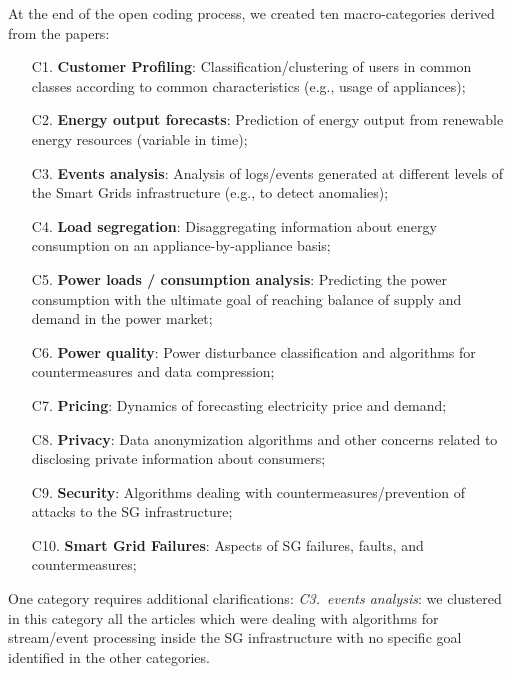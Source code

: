 \documentclass[journal]{IEEEtran}
\begin{document}
At the end of the open coding process, we created ten macro-categories derived from the papers: 

\begin{enumerate}
\item[C1.] \textbf{Customer Profiling}: Classification/clustering of users in common classes according to common characteristics (e.g., usage
of appliances);
\item[C2.] \textbf{Energy output forecasts}: Prediction of energy output from renewable energy resources (variable in time);
\item[C3.] \textbf{Events analysis}: Analysis of logs/events generated at different levels of the Smart Grids infrastructure (e.g., to detect anomalies);
\item[C4.] \textbf{Load segregation}: Disaggregating information about energy consumption on an appliance-by-appliance basis;
\item[C5.] \textbf{Power loads / consumption analysis}: Predicting the power consumption with the ultimate goal of reaching  balance of supply and demand in the power market;
\item[C6.] \textbf{Power quality}: Power disturbance classification and algorithms for countermeasures and data compression;
\item[C7.] \textbf{Pricing}: Dynamics of forecasting electricity price and demand;
\item[C8.] \textbf{Privacy}: Data anonymization algorithms and other concerns related to disclosing private information about consumers;
\item[C9.] \textbf{Security}: Algorithms dealing with countermeasures/prevention of attacks to the SG infrastructure;
\item[C10.] \textbf{Smart Grid Failures}: Aspects of SG failures, faults, and countermeasures;
\end{enumerate}

One category requires additional clarifications: \textit{C3.~events analysis}: we clustered in this category all the articles which were dealing with algorithms for stream/event processing inside the SG infrastructure with no specific goal identified in the other categories.
\end{document}
